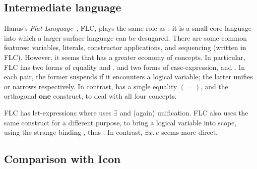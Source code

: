 \documentclass[acmsmall]{acmart}
\newcommand{\Varid}[1]{\mathit{#1}}
\begin{document}
\subsection{Intermediate language}

Hanus's \emph{Flat Language}~\cite[Fig 1]{hanus:semantics}, FLC, plays the same role as \versecalc{}:
it is a small core language
into which a larger surface language can be desugared.
There are some common features: variables, literals, constructor applications,
and sequencing (written  in FLC).
However, it seems that \versecalc{} has a greater economy of concepts.
In particular, FLC
has two forms of equality  and , and two forms
of case-expression,  and .  In each pair, the former suspends
if it encounters a logical variable; the latter unifies or narrows
respectively. In contrast, \versecalc{}
has a single equality \ensuremath{(\mathrel{=})}, and the orthogonal \ensuremath{\textbf{one}} construct, to deal with all four concepts.

FLC has let-expressions  where \versecalc{} uses
\ensuremath{\exists{}} and (again) unification.
FLC also uses the same construct for a different purpose, to
bring a logical variable into scope, using the strange binding , thus .
In contrast, \ensuremath{\exists\Varid{x}.\,\Varid{e}} seems more direct.

\subsection{Comparison with Icon} \label{sec:icon}
\end{document}
